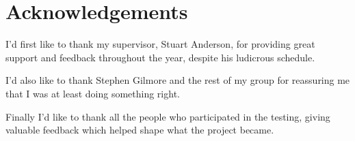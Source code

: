 \section*{Acknowledgements}

	I'd first like to thank my supervisor, Stuart Anderson, for providing great
	support and feedback throughout the year, despite his ludicrous schedule.
	
	I'd also like to thank Stephen Gilmore and the rest of my group for reassuring me
	that I was at least doing something right.
	
	Finally I'd like to thank all the people who participated in the testing,
	giving valuable feedback which helped shape what the project became.
